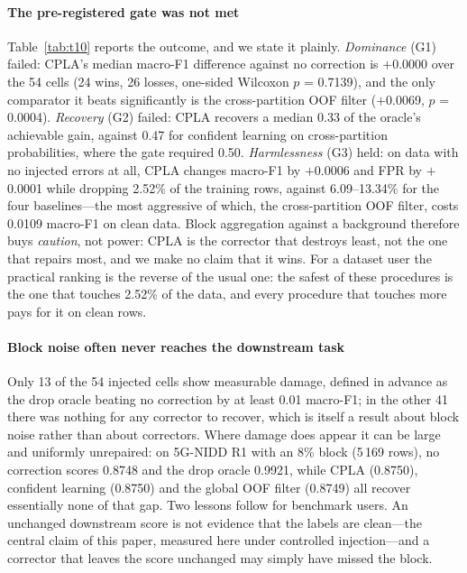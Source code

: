 \documentclass[preprint,12pt]{elsarticle}
\begin{document}
\paragraph{The pre-registered gate was not met} Table~\ref{tab:t10} reports the
outcome, and we state it plainly. \emph{Dominance} (G1) failed: CPLA's median
macro-F1 difference against no correction is $+$0.0000 over the 54 cells (24
wins, 26 losses, one-sided Wilcoxon $p$ = 0.7139), and the only comparator it
beats significantly is the cross-partition OOF filter ($+$0.0069, $p$ = 0.0004).
\emph{Recovery} (G2) failed: CPLA recovers a median 0.33 of the oracle's
achievable gain, against 0.47 for confident learning on cross-partition
probabilities, where the gate required 0.50. \emph{Harmlessness} (G3) held: on
data with no injected errors at all, CPLA changes macro-F1 by $+$0.0006 and FPR
by $+$0.0001 while dropping 2.52\% of the training rows, against 6.09--13.34\%
for the four baselines---the most aggressive of which, the cross-partition OOF
filter, costs 0.0109 macro-F1 on clean data. Block aggregation against a
background therefore buys \emph{caution}, not power: CPLA is the corrector that
destroys least, not the one that repairs most, and we make no claim that it
wins. For a dataset user the practical ranking is the reverse of the usual one:
the safest of these procedures is the one that touches 2.52\% of the data, and
every procedure that touches more pays for it on clean rows.

\paragraph{Block noise often never reaches the downstream task} Only 13 of the
54 injected cells show measurable damage, defined in advance as the drop oracle
beating no correction by at least 0.01 macro-F1; in the other 41 there was
nothing for any corrector to recover, which is itself a result about block
noise rather than about correctors. Where damage does appear it can be large and
uniformly unrepaired: on 5G-NIDD R1 with an 8\% block (5\,169 rows), no
correction scores 0.8748 and the drop oracle 0.9921, while CPLA (0.8750),
confident learning (0.8750) and the global OOF filter (0.8749) all recover
essentially none of that gap. Two lessons follow for benchmark users. An
unchanged downstream score is not evidence that the labels are clean---the
central claim of this paper, measured here under controlled injection---and a
corrector that leaves the score unchanged may simply have missed the block.
\end{document}
